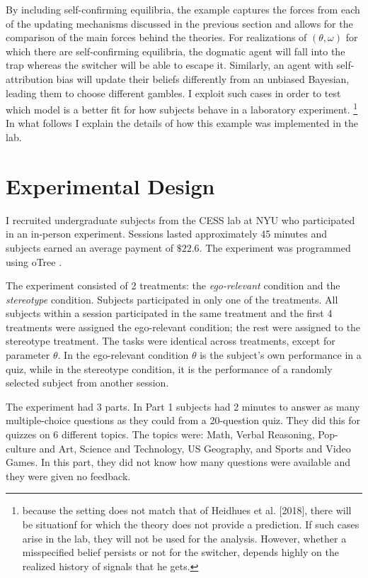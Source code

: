 \documentclass[
  12pt,
]{article}
\begin{document}
By including self-confirming equilibria, the example captures the forces
from each of the updating mechanisms discussed in the previous section
and allows for the comparison of the main forces behind the theories.
For realizations of \((\theta, \omega)\) for which there are
self-confirming equilibria, the dogmatic agent will fall into the trap
whereas the switcher will be able to escape it. Similarly, an agent with
self-attribution bias will update their beliefs differently from an
unbiased Bayesian, leading them to choose different gambles. I exploit
such cases in order to test which model is a better fit for how subjects
behave in a laboratory experiment.
\footnote{because the setting does not match that of Heidhues et al. [2018], there will be situationf for which the theory 
does not provide a prediction. If such cases arise in the lab, they will not be used for the analysis. However, whether a misspecified 
belief persists or not for the switcher, depends highly on the realized history of signals that he gets.}
In what follows I explain the details of how this example was
implemented in the lab.

\hypertarget{experimental-design}{%
\section{Experimental Design}\label{experimental-design}}

I recruited undergraduate subjects from the CESS lab at NYU who
participated in an in-person experiment. Sessions lasted approximately
45 minutes and subjects earned an average payment of \(\$22.6\). The
experiment was programmed using oTree \citep{chen2016otree}.

The experiment consisted of 2 treatments: the \emph{ego-relevant}
condition and the \emph{stereotype} condition. Subjects participated in
only one of the treatments. All subjects within a session participated
in the same treatment and the first 4 treatments were assigned the
ego-relevant condition; the rest were assigned to the stereotype
treatment. The tasks were identical across treatments, except for
parameter \(\theta\). In the ego-relevant condition \(\theta\) is the
subject's own performance in a quiz, while in the stereotype condition,
it is the performance of a randomly selected subject from another
session.

The experiment had 3 parts. In Part 1 subjects had 2 minutes to answer
as many multiple-choice questions as they could from a 20-question quiz.
They did this for quizzes on 6 different topics. The topics were: Math,
Verbal Reasoning, Pop-culture and Art, Science and Technology, US
Geography, and Sports and Video Games. In this part, they did not know
how many questions were available and they were given no feedback.
\end{document}
